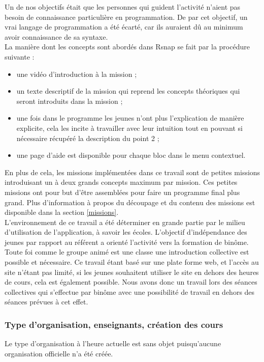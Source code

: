 Un de nos objectifs était que les personnes qui guident l'activité n'aient pas besoin de connaissance particulière en programmation. De par cet objectif, un vrai langage de programmation a été écarté, car ils auraient dû au minimum avoir connaissance de sa syntaxe.\\

La manière dont les concepts sont abordés dans Rsnap se fait par la procédure suivante :
\begin{itemize}
	\item une vidéo d'introduction à la mission ;
	\item un texte descriptif de la mission qui reprend les concepts théoriques qui seront introduits dans la mission ;
	\item une fois dans le programme les jeunes n'ont plus l'explication de manière explicite, cela les incite à travailler avec leur intuition tout en pouvant si nécessaire récupéré la description du point 2 ;
	\item une page d'aide est disponible pour chaque bloc dans le menu contextuel.
\end{itemize}

En plus de cela, les missions implémentées dans ce travail sont de petites missions introduisant un à deux grands concepts maximum par mission. Ces petites missions ont pour but d'être assemblées pour faire un programme final plus grand. Plus d'information à propos du découpage et du contenu des missions est disponible dans la section \ref{missions}.\\

L'environnement de ce travail a été déterminer en grande partie par le milieu d'utilisation de l'application, à savoir les écoles. L'objectif d'indépendance des jeunes par rapport au référent a orienté l'activité vers la formation de binôme. Toute foi comme le groupe animé est une classe une introduction collective est possible et nécessaire. Ce travail étant basé sur une plate forme web, et l'accès au site n'étant pas limité, si les jeunes souhaitent utiliser le site en dehors des heures de cours, cela est également possible.
Nous avons donc un travail lors des séances collectives qui s'effectue par binôme avec une possibilité de travail en dehors des séances prévues à cet effet.

\subsubsection{Type d'organisation, enseignants, création des cours}
Le type d'organisation à l'heure actuelle est sans objet puisqu'aucune organisation officielle n'a été créée.\\

